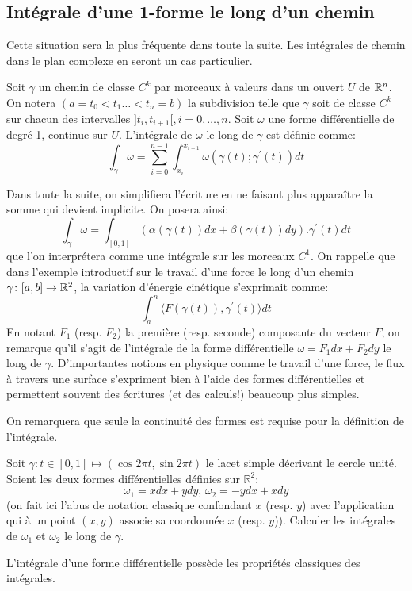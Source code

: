 \subsection{Intégrale d'une 1-forme le long d'un chemin}
Cette situation sera la plus fréquente dans toute la suite. Les intégrales de chemin dans le plan complexe en seront un cas particulier. 
\begin{fdefn}
Soit $\gamma$ un chemin de classe $C^k$ par morceaux à valeurs dans un ouvert $U$ de $\mathbb{R}^n$. On notera $ (a=t_0 < t_1 \dots < t_n = b)$ la subdivision telle que $\gamma$ soit de classe $C^k$ sur chacun des intervalles $]t_i,t_{i+1}[, i=0,\dots,n$. Soit 
$\omega$
 une
forme différentielle de degré 1, continue sur $U$. L'intégrale de $\omega$ le long de $\gamma$ est définie comme:
\[
\int_{\gamma} \omega = \sum_{i=0}^{n-1} \int_{x_i}^{x_{i+1}} \omega\left(\gamma(t); \gamma^\prime(t)\right) dt
\]
\end{fdefn}
Dans toute la suite, on simplifiera l'écriture en ne faisant plus apparaître la somme qui devient implicite. On posera ainsi:
\[\int_{\gamma} \omega = \int_{[0,1]} \left (\alpha(\gamma(t)) dx +
\beta(\gamma(t)) dy \right). \gamma^\prime(t) dt
\]
que l'on interprétera comme une intégrale sur les morceaux $C^1$. 
On rappelle que dans l'exemple introductif sur le travail d'une force le long d'un chemin $\gamma \colon [a,b] \to \mathbb{R}^2$, la variation d'énergie cinétique s'exprimait comme:
\[
\int_a^n \langle F(\gamma(t)), \gamma^\prime(t) \rangle dt
\]
En notant $F_1$ (resp. $F_2$) la première (resp. seconde) composante du vecteur $F$, on remarque qu'il s'agit de l'intégrale de la forme différentielle $\omega = F_1 dx + F_2 dy$ le long de $\gamma$. D'importantes notions en physique comme le travail d'une force, le flux à travers une surface s'expriment bien à l'aide des formes différentielles et permettent souvent des écritures (et des calculs!) beaucoup plus simples. 

On remarquera que seule la continuité des formes est requise pour la définition de l'intégrale. 

\begin{exercice}
Soit $\gamma \colon t \in [0,1] \mapsto (\cos 2 \pi t, \sin 2 \pi t)$ le lacet
simple décrivant le cercle unité. Soient les deux formes différentielles
définies sur $\mathbb{R}^2$:
\[
\omega_1 =  x dx + y dy, \, \omega_2 = -y dx + x dy
\]
(on fait ici l'abus de notation classique confondant $x$ (resp. $y$) avec
l'application qui à un point $(x,y)$ associe sa coordonnée $x$ (resp. $y$)).
Calculer les intégrales de $\omega_1$ et $\omega_2$ le long de $\gamma$.
\end{exercice}
L'intégrale d'une forme différentielle possède les propriétés classiques des
intégrales.


